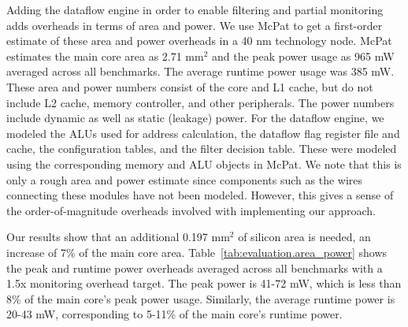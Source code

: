 Adding the dataflow engine in order to enable filtering and partial monitoring adds
overheads in terms of area and power. We use McPat \cite{mcpat-micro09} to get
a first-order estimate of these area and power overheads in a 40 nm technology
node. McPat estimates the main core area as 2.71 mm$^2$ and the peak power usage as
965 mW averaged across all benchmarks. The average runtime power usage was 385 
mW. These area and power numbers consist of the core and
L1 cache, but do not include L2 cache, memory controller, and other
peripherals. The power numbers include dynamic as well as static (leakage)
power. For the dataflow engine, we modeled the ALUs used for address
calculation, the dataflow flag register file and cache, the configuration
tables, and the filter decision table. These were modeled using the
corresponding memory and ALU objects in McPat. We
note that this is only a rough area and power estimate since components such as the
wires connecting these modules have not been modeled. However, this gives a
sense of the order-of-magnitude overheads involved with implementing our
approach.

Our results show that an additional 0.197 mm$^2$ of silicon area is needed, an
increase of 7\% of the main core area. Table~\ref{tab:evaluation.area_power}
shows the peak and runtime power overheads averaged across all benchmarks with
a 1.5x monitoring overhead target. The peak power is 41-72 mW, which is
less than 8\% of the main core's peak power usage. Similarly, the average runtime power is 20-43
mW, corresponding to 5-11\% of the main core's runtime power.

